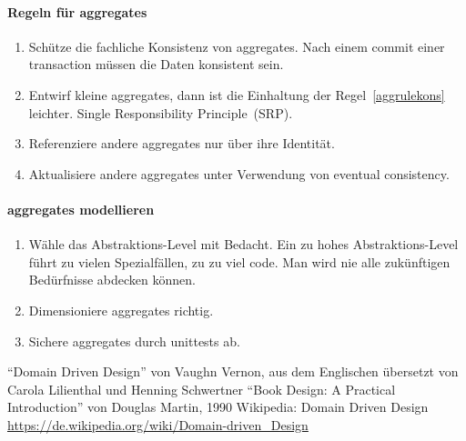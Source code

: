 \documentclass[11pt,a4paper]{scrartcl}
\begin{document}
\paragraph{Regeln für aggregates}
\begin{enumerate}
	\item\label{aggrulekons} Schütze die fachliche Konsistenz von aggregates. Nach einem commit einer transaction müssen die Daten konsistent sein.
	\item Entwirf kleine aggregates, dann ist die Einhaltung der Regel~\ref{aggrulekons} leichter. Single Responsibility Principle~(SRP).
	\item Referenziere andere aggregates nur über ihre Identität.
	\item Aktualisiere andere aggregates unter Verwendung von eventual consistency.
\end{enumerate}

\paragraph{aggregates modellieren}
\begin{enumerate}
	\item Wähle das Abstraktions-Level mit Bedacht. Ein zu hohes Abstraktions-Level führt zu vielen Spezialfällen, zu zu viel code. Man wird nie alle zukünftigen Bedürfnisse abdecken können.
	\item Dimensioniere aggregates richtig.
	\item Sichere aggregates durch unittests ab.
\end{enumerate}

\nocite{*} %

\begin{thebibliography}{\hspace{1cm}}
	 ``Domain Driven Design'' von Vaughn Vernon, aus dem Englischen übersetzt von Carola Lilienthal und Henning Schwertner
	 ``Book Design: A Practical Introduction'' von Douglas Martin, 1990
	 Wikipedia: Domain Driven Design \url{https://de.wikipedia.org/wiki/Domain-driven_Design}
\end{thebibliography}
\end{document}
